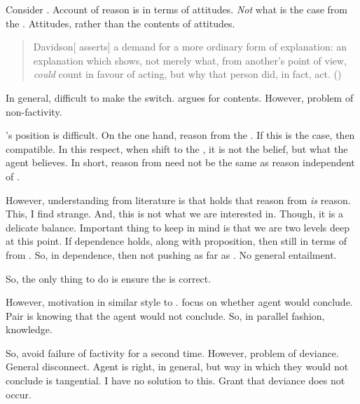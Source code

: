 \begin{note}
  Consider \citeauthor{Davidson:1963aa}.
  Account of reason is in terms of attitudes.
  \emph{Not} what is the case from the \agpe{}.
  Attitudes, rather than the contents of attitudes.

  \begin{quote}
    Davidson[ asserts] a demand for a more ordinary form of explanation:
    an explanation which shows, not merely what, from another's point of view, \emph{could} count in favour of acting, but why that person did, in fact, act.%
    \mbox{}\hfill\mbox{(\cite[417]{Hieronymi:2011aa})}
  \end{quote}

  In general, difficult to make the switch.
  \textcite{Dancy:2000aa} argues for contents.
  However, problem of non-factivity.

  \citeauthor{Dancy:2000aa}'s position is difficult.
  On the one hand, reason from the \agpe{}.
  If this is the case, then compatible.
  In this respect, when shift to the \agpe{}, it is not the \agents{} belief, but what the agent believes.
  In short, reason from \agpe{} need not be the same as reason independent of \agpe{}.

  However, understanding from literature is that \citeauthor{Dancy:2000aa} holds that reason from \agpe{} \emph{is} reason.
  This, I find strange.
  And, this is not what we are interested in.
  Though, it is a delicate balance.
  Important thing to keep in mind is that we are two levels deep at this point.
  If dependence holds, along with proposition, then still in terms of \ros{} from \agpe{}.
  So, in dependence, then not pushing as far as \citeauthor{Dancy:2000aa}.
  No general entailment.
\end{note}

\begin{note}
  So, the only thing to do is ensure the \agpe{} is correct.

  However, motivation in similar style to .
   focus on whether agent would conclude.
  Pair is knowing that the agent would not conclude.
  So, in parallel fashion, knowledge.
\end{note}

\begin{note}
  So, avoid failure of factivity for a second time.
  However, problem of deviance.
  General disconnect.
  Agent is right, in general, but way in which they would not conclude is tangential.
  I have no solution to this.
  Grant that deviance does not occur.
\end{note}

